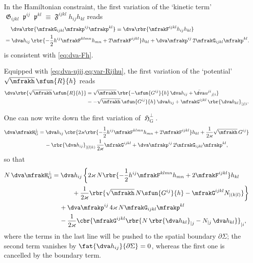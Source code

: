 \documentclass[a4paper,11pt]{article}
\begin{document}
In the Hamiltonian constraint, the first variation of the `kinetic term'
$\mfrakG_{ijkl}\mfrakp^{ij}\mfrakp^{kl} \equiv
\mfrakF^{ijkl}h_{ij}h_{kl}$ reads
\begin{align}
&\quad\,\dva\rbr{ \mfrakG_{ijkl} \mfrakp^{ij}\mfrakp^{kl}}
\equiv \dva\rbr{\mfrakF^{ijkl}h_{ij}h_{kl}}
\\
&=\dva h_{ij}\,\rbr{-\frac{1}{2} h^{ij} \mfrakF^{klmn} h_{mn}
+ 2 \mfrakF^{ijkl} } h_{kl} 
+\dva \mfrakp^{ij}\,2 \mfrakG_{ijkl}\mfrakp^{kl}.
\label{eq:dva-Fhh}
\end{align}
 is consistent with \cref{eq:dva-Fh}.

Equipped with \cref{eq:dva-ujij,eq:var-Rijhu}, the first variation of the 
`potential' 
$\sqrt{\mfrakh}\,\sfun{R}{h}$ reads
\begin{align}
\dva\rbr{\sqrt{\mfrakh}\,\sfun{R}{h}} &= \sqrt{\mfrakh}\,
\rbr{-\sfun{G^{ij}}{h}\,\dva h_{ij} +
\bar{\dva}u^{ji}{}_{j|i}}
\\
&= -\sqrt{\mfrakh}\,\sfun{G^{ij}}{h}\,\dva h_{ij} +
\mfrakG^{ijkl}\,\rbr{\dva h_{kl}}_{|j|i}.
\end{align}

One can now write down the first variation of $\mfrakH_\text{G}^\perp$.
\begin{align}
\dva \mfrakH_\text{G}^\perp &= 
\dva h_{ij}\,\cbr{2\varkappa \rbr{-\frac{1}{2} h^{ij} \mfrakF^{klmn} h_{mn} + 
2 \mfrakF^{ijkl}}h_{kl} + \frac{1}{2\varkappa} \sqrt{\mfrakh}\,G^{ij}}
\nonumber \\
&\quad\,
-\rbr{\dva h_{ij}}_{|(l|k)}\,\frac{1}{2\varkappa} \mfrakG^{ijkl}
+\dva \mfrakp^{ij}\,2\mfrakG_{ijkl}\mfrakp^{kl},
\end{align}
so that
\begin{align}
N\,\dva \mfrakH_\text{G}^\perp &= \dva h_{ij}\,\bigg\{
2\varkappa\,N\rbr{ -\frac{1}{2}h^{ij} \mfrakF^{klmn} h_{mn}
+ 2 \mfrakF^{ijkl}} h_{kl}
\nonumber \\
&\quad\,\qquad
+\frac{1}{2\varkappa}
\rbr{ \sqrt{\mfrakh}\,N\sfun{G^{ij}}{h}
-\mfrakG^{ijkl}N_{|(k|l)}}\bigg\}
\nonumber \\
&\quad\,
+\dva \mfrakp^{ij}\,4\varkappa\,N\mfrakG_{ijkl}\mfrakp^{kl}
\nonumber \\
&\quad\,
-\frac{1}{2\varkappa}
\cbr{\mfrakG^{ijkl}
\rbr{N\,\rbr{\dva h_{kl}}_{|j} - N_{|j}\,\dva h_{kl}} }_{|i},
\end{align}
where the terms in the last line will be pushed to the spatial boundary
$\partial\Sigma$; the second term vanishes by $\fat{\dva 
h_{ij}}{\partial\Sigma} 
= 0$, whereas the first one is cancelled by the boundary term.
\end{document}
